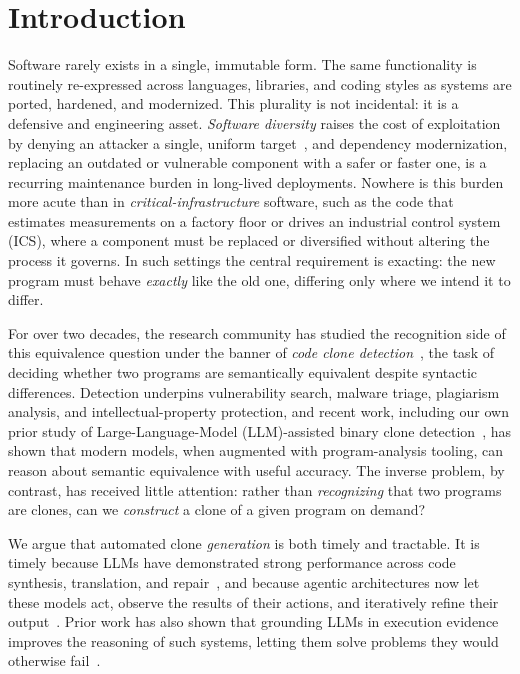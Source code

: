 \section{Introduction}
\label{sec:intro}

Software rarely exists in a single, immutable form. The same functionality is routinely re-expressed across languages, libraries, and coding styles as systems are ported, hardened, and modernized. This plurality is not incidental: it is a defensive and engineering asset. \emph{Software diversity} raises the cost of exploitation by denying an attacker a single, uniform target~\cite{larsen2014sok}, and dependency modernization, replacing an outdated or vulnerable component with a safer or faster one, is a recurring maintenance burden in long-lived deployments. Nowhere is this burden more acute than in \emph{critical-infrastructure} software, such as the code that estimates measurements on a factory floor or drives an industrial control system (ICS), where a component must be replaced or diversified without altering the process it governs. In such settings the central requirement is exacting: the new program must behave \emph{exactly} like the old one, differing only where we intend it to differ.

For over two decades, the research community has studied the recognition side of this equivalence question under the banner of \emph{code clone detection}~\cite{roy2009comparison,sajnani2016sourcerercc,bin_sim_survey}, the task of deciding whether two programs are semantically equivalent despite syntactic differences. Detection underpins vulnerability search, malware triage, plagiarism analysis, and intellectual-property protection, and recent work, including our own prior study of Large-Language-Model (LLM)-assisted binary clone detection~\cite{agadakos2025bcd}, has shown that modern models, when augmented with program-analysis tooling, can reason about semantic equivalence with useful accuracy. The inverse problem, by contrast, has received little attention: rather than \emph{recognizing} that two programs are clones, can we \emph{construct} a clone of a given program on demand?

We argue that automated clone \emph{generation} is both timely and tractable. It is timely because LLMs have demonstrated strong performance across code synthesis, translation, and repair~\cite{chen2021codex,li2022alphacode,roziere2020transcoder}, and because agentic architectures now let these models act, observe the results of their actions, and iteratively refine their output~\cite{yao2023react,shinn2023reflexion}. Prior work has also shown that grounding LLMs in execution evidence improves the reasoning of such systems, letting them solve problems they would otherwise fail~\cite{agadakos2025bcd}.

